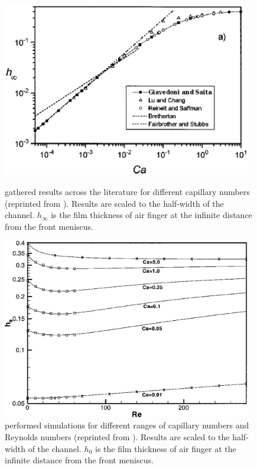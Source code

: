 \documentclass[preprint,12pt]{elsarticle}
\begin{document}
\begin{figure}
\includegraphics[width=0.97\textwidth]{Figures/giavedoni_planar.eps}
\caption{\citet{giavedoni-numerical} gathered results across the
literature for different capillary numbers (reprinted from \cite{giavedoni-numerical}). Results are
scaled to the half-width of the
channel. $h_{\infty}$ is the film thickness of air finger at
the infinite distance from the front meniscus. \label{fig:giavedoni:planar}}
\includegraphics[width=0.97\textwidth]{Figures/heil-planar.eps}
\caption{\citet{heil-bretherton} performed simulations for different ranges of
capillary numbers and Reynolds numbers (reprinted from \cite{heil-bretherton}). Results
are scaled to the half-width of the channel. $h_{0}$ is the film thickness of air finger at
the infinite distance from the front meniscus.
\label{fig:heil:planar}}
\end{figure}
\end{document}
